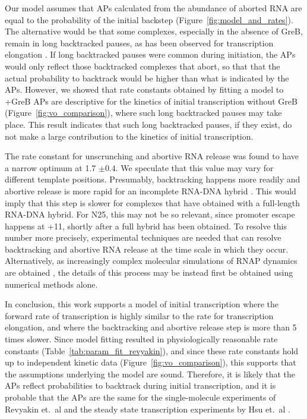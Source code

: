 Our model assumes that APs calculated from the abundance of aborted RNA are
equal to the probability of the initial backstep
(Figure~\ref{fig:model_and_rates}). The alternative would be that some
complexes, especially in the absence of GreB, remain in long backtracked
pauses, as has been observed for transcription elongation
\cite{shaevitz_backtracking_2003}. If long backtracked pauses were common
during initiation, the APs would only reflect those backtracked
complexes that abort, so that that the actual probability to backtrack would
be higher than what is indicated by the APs. However, we showed that rate
constants obtained by fitting a model to +GreB APs are descriptive for the
kinetics of initial transcription without GreB
(Figure~\ref{fig:vo_comparison}), where such long backtracked pauses may take
place. This result indicates that such long backtracked pauses, if they exist,
do not make a large contribution to the kinetics of initial transcription.

The rate constant for unscrunching and abortive RNA release was found to have
a narrow optimum at 1.7 $\pm 0.4$. We speculate that this value may vary for
different template positions. Presumably, backtracking happens more readily
and abortive release is more rapid for an incomplete RNA-DNA hybrid
\cite{nudler_rnadna_1997,komissarova_shortening_2002}. This would imply that
this step is slower for complexes that have obtained with a full-length
RNA-DNA hybrid. For N25, this may not be so relevant, since promoter escape
happens at +11, shortly after a full hybrid has been obtained. To resolve
this number more precisely, experimental techniques are needed that can
resolve backtracking and abortive RNA release at the time scale in which they
occur. Alternatively, as increasingly complex molecular simulations of RNAP
dynamics are obtained \cite{silva_millisecond_2014}, the details of this
process may be instead first be obtained using numerical methods alone.

In conclusion, this work supports a model of initial transcription where the
forward rate of transcription is highly similar to the rate for transcription
elongation, and where the backtracking and abortive release step is more than
5 times slower. Since model fitting resulted in physiologically reasonable
rate constants (Table~\ref{tab:param_fit_revyakin}), and since these rate
constants hold up to independent kinetic data
(Figure~\ref{fig:vo_comparison}), this supports that the assumptions
underlying the model are sound. Therefore, it is likely that the APs
reflect probabilities to backtrack during initial transcription, and it is
probable that the APs are the same for the single-molecule experiments of
Revyakin et.\ al \cite{revyakin_abortive_2006} and the steady state
transcription experiments by Hsu et.\ al \cite{hsu_initial_2006}.
 
